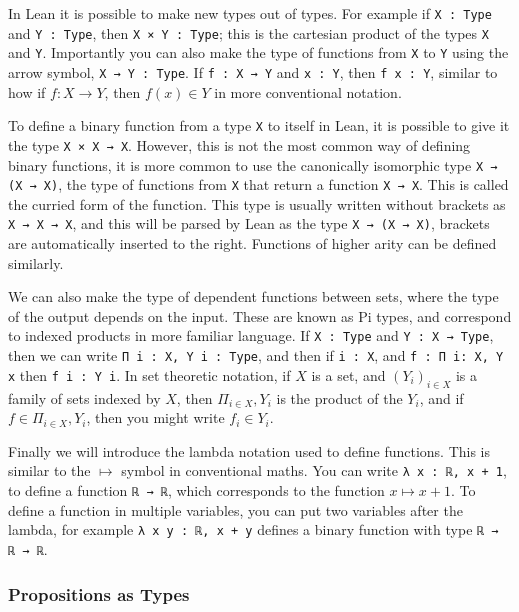 \documentclass[12pt]{article} %
\theoremstyle{definition}
\theoremstyle{definition}
\theoremstyle{definition}
\theoremstyle{definition}
\begin{document}
In Lean it is possible to make new types out of types. For example if \lstinline{X : Type}
and \lstinline{Y : Type}, then \lstinline{X × Y : Type}; this is the cartesian
product of the types \lstinline{X} and \lstinline{Y}. Importantly you can also make the type
of functions from \lstinline{X} to \lstinline{Y} using the arrow symbol,
\lstinline{X → Y : Type}. If \lstinline{f : X → Y} and \lstinline{x : Y}, then
\lstinline{f x : Y}, similar to how if $f : X \to Y$, then $f(x) \in Y$
in more conventional notation.

To define a binary function from a type \lstinline{X} to itself in Lean,
it is possible to give it the type \lstinline{X × X → X}. However, this is not
the most common way of defining binary functions, it is more common to use the
canonically isomorphic type \lstinline{X → (X → X)}, the type of functions
from \lstinline{X} that return a function \lstinline{X → X}.
This is called the curried form of the function. This type is usually written without
brackets as \lstinline{X → X → X}, and this will be parsed by Lean as the type
\lstinline{X → (X → X)}, brackets are automatically inserted to the right.
Functions of higher arity can be defined similarly.

We can also make the type of dependent functions between sets,
where the type of the output depends on the input. These are known as Pi types, and correspond
to indexed products in more familiar language.
If \lstinline{X : Type} and \lstinline{Y : X → Type}, then we can write
\lstinline{Π i : X, Y i : Type}, and then if \lstinline{i : X},
and \lstinline{f : Π i: X, Y x} then \lstinline{f i : Y i}.
In set theoretic notation, if $X$ is a set,
and $(Y_i)_{i \in X}$ is a family of sets indexed by $X$, then
$\Pi_{i \in X}, Y_i$ is the product of the $Y_i$, and if
$f \in \Pi_{i \in X}, Y_i$, then you might write $f_i \in Y_i$.

Finally we will introduce the lambda notation used to define functions. This
is similar to the $\mapsto$ symbol in conventional maths. You can write
\lstinline{λ x : ℝ, x + 1}, to define a function \lstinline{ℝ → ℝ},
which corresponds to the function $x \mapsto x + 1$. To define a function
in multiple variables, you can put two variables after the lambda, for example
\lstinline{λ x y : ℝ, x + y} defines a binary function with type \lstinline{ℝ → ℝ → ℝ}.

\subsubsection{Propositions as Types}
\end{document}
